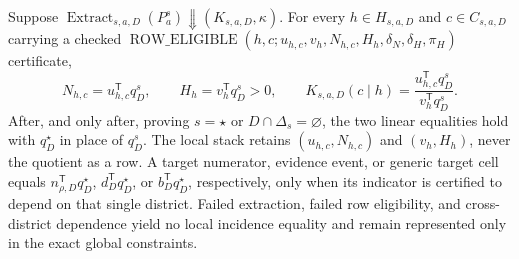 Suppose \(\operatorname{Extract}_{s,a,D}(P_a^s)\Downarrow(K_{s,a,D},\kappa)\).  For every \(h\in H_{s,a,D}\) and \(c\in C_{s,a,D}\) carrying a checked \(\operatorname{ROW\_ELIGIBLE}(h,c;u_{h,c},v_h,N_{h,c},H_h,\delta_N,\delta_H,\pi_H)\) certificate,
\[
N_{h,c}=u_{h,c}^{\mathsf T}q_D^s,
\qquad
H_h=v_h^{\mathsf T}q_D^s>0,
\qquad
K_{s,a,D}(c\mid h)=\frac{u_{h,c}^{\mathsf T}q_D^s}{v_h^{\mathsf T}q_D^s}.
\]
After, and only after, proving \(s=\star\) or \(D\cap\Delta_s=\varnothing\), the two linear equalities hold with \(q_D^\star\) in place of \(q_D^s\).  The local stack retains \((u_{h,c},N_{h,c})\) and \((v_h,H_h)\), never the quotient as a row.  A target numerator, evidence event, or generic target cell equals \(n_{\rho,D}^{\mathsf T}q_D^\star\), \(d_D^{\mathsf T}q_D^\star\), or \(b_D^{\mathsf T}q_D^\star\), respectively, only when its indicator is certified to depend on that single district.  Failed extraction, failed row eligibility, and cross-district dependence yield no local incidence equality and remain represented only in the exact global constraints.